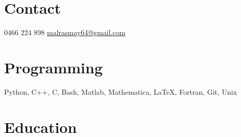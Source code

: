 \documentclass[]{friggeri-cv} %
\begin{document}


\begin{aside} %
\section{Contact}
0466 224 898
\href{mailto:malramsay64@gmail.com}{malrasmay64@gmail.com}
\section{Programming}
Python, C++, C, Bash,
Matlab, Mathematica,
\LaTeX, Fortran, Git,
Unix
\end{aside}


\section{Education}
\end{document}
